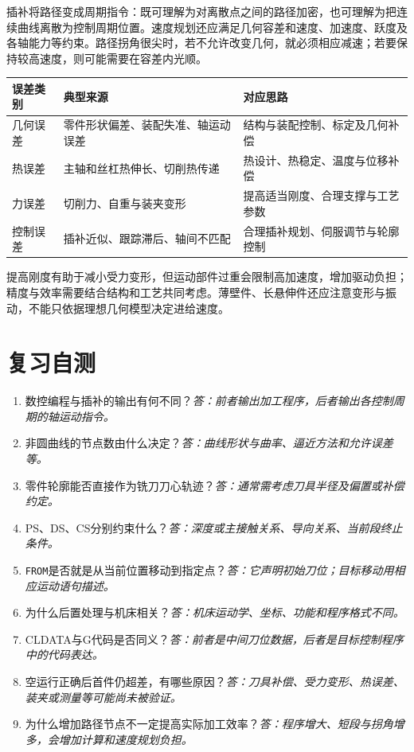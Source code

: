 插补将路径变成周期指令：既可理解为对离散点之间的路径加密，也可理解为把连续曲线离散为控制周期位置。速度规划还应满足几何容差和速度、加速度、跃度及各轴能力等约束。路径拐角很尖时，若不允许改变几何，就必须相应减速；若要保持较高速度，则可能需要在容差内光顺。

\begin{center}
\begin{tabularx}{\linewidth}{@{}p{.18\linewidth}XX@{}}
\toprule
误差类别 & 典型来源 & 对应思路\\
\midrule
几何误差 & 零件形状偏差、装配失准、轴运动误差 & 结构与装配控制、标定及几何补偿\\
热误差 & 主轴和丝杠热伸长、切削热传递 & 热设计、热稳定、温度与位移补偿\\
力误差 & 切削力、自重与装夹变形 & 提高适当刚度、合理支撑与工艺参数\\
控制误差 & 插补近似、跟踪滞后、轴间不匹配 & 合理插补规划、伺服调节与轮廓控制\\
\bottomrule
\end{tabularx}
\end{center}

提高刚度有助于减小受力变形，但运动部件过重会限制高加速度，增加驱动负担；精度与效率需要结合结构和工艺共同考虑。薄壁件、长悬伸件还应注意变形与振动，不能只依据理想几何模型决定进给速度。


\Needspace{11cm}
\section{复习自测}
\begin{enumerate}
\item 数控编程与插补的输出有何不同？\textit{答：前者输出加工程序，后者输出各控制周期的轴运动指令。}
\item 非圆曲线的节点数由什么决定？\textit{答：曲线形状与曲率、逼近方法和允许误差等。}
\item 零件轮廓能否直接作为铣刀刀心轨迹？\textit{答：通常需考虑刀具半径及偏置或补偿约定。}
\item PS、DS、CS分别约束什么？\textit{答：深度或主接触关系、导向关系、当前段终止条件。}
\item \texttt{FROM}是否就是从当前位置移动到指定点？\textit{答：它声明初始刀位；目标移动用相应运动语句描述。}
\item 为什么后置处理与机床相关？\textit{答：机床运动学、坐标、功能和程序格式不同。}
\item CLDATA与G代码是否同义？\textit{答：前者是中间刀位数据，后者是目标控制程序中的代码表达。}
\item 空运行正确后首件仍超差，有哪些原因？\textit{答：刀具补偿、受力变形、热误差、装夹或测量等可能尚未被验证。}
\item 为什么增加路径节点不一定提高实际加工效率？\textit{答：程序增大、短段与拐角增多，会增加计算和速度规划负担。}
\end{enumerate}
